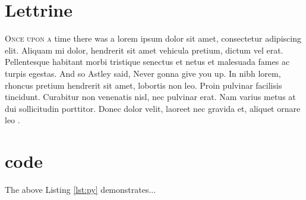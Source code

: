 \section{Lettrine}
\lettrine{O}{\fontsize{14}\fscshape{}\selectfont{}nce upon a} time there was a lorem ipsum dolor sit amet, consectetur adipiscing elit. Aliquam mi dolor, hendrerit sit amet vehicula pretium, dictum vel erat. Pellentesque habitant morbi tristique senectus et netus et malesuada fames ac turpis egestas. And so Astley \citeyear{astley1987never} said, Never gonna give you up. In nibh lorem, rhoncus pretium hendrerit sit amet, lobortis non leo. Proin pulvinar facilisis tincidunt. Curabitur non venenatis nisl, nec pulvinar erat. Nam varius metus at dui sollicitudin porttitor. Donec dolor velit, laoreet nec gravida et, aliquet ornare leo \cite{astley1987never}. 


\section{code}



The above Listing \ref{lst:py} demonstrates...